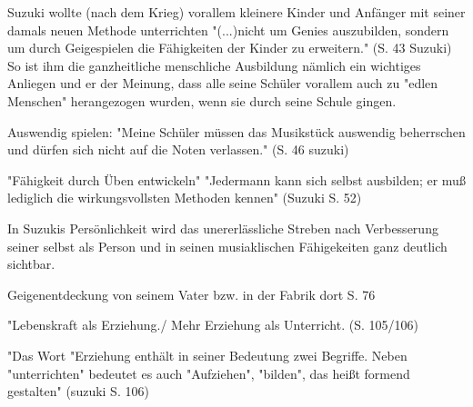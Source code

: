 Suzuki wollte (nach dem Krieg) vorallem kleinere Kinder und Anfänger mit seiner
damals neuen Methode unterrichten "(...)nicht um Genies auszubilden, sondern um
durch Geigespielen die Fähigkeiten der Kinder zu erweitern." (S. 43 Suzuki) So
ist ihm die ganzheitliche menschliche Ausbildung nämlich ein wichtiges Anliegen
und er der Meinung, dass alle seine Schüler vorallem auch zu "edlen Menschen"
herangezogen wurden, wenn sie durch seine Schule gingen. 

Auswendig spielen: "Meine Schüler müssen das Musikstück auswendig beherrschen
und dürfen sich nicht auf die Noten verlassen." (S. 46 suzuki)

"Fähigkeit durch Üben entwickeln" "Jedermann kann sich selbst ausbilden; er muß
lediglich die wirkungsvollsten Methoden kennen" (Suzuki S. 52)

In Suzukis Persönlichkeit wird das unererlässliche Streben nach Verbesserung
seiner selbst als Person und in seinen musiaklischen Fähigekeiten ganz deutlich
sichtbar.


Geigenentdeckung von seinem Vater bzw. in der Fabrik dort S. 76

"Lebenskraft als Erziehung./ Mehr Erziehung als Unterricht. (S. 105/106)

"Das Wort "Erziehung enthält in seiner Bedeutung zwei Begriffe. Neben
"unterrichten" bedeutet es auch "Aufziehen", "bilden", das heißt formend
gestalten" (suzuki S. 106)



